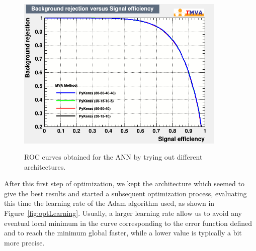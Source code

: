 \documentclass[a4paper, 10pt, openright]{report}
\begin{document}
\begin{appendices}
\begin{figure}[htbp]
\centering
\includegraphics[width=10cm, height=8cm]{figs/DNN_architectures.png}
\caption{\ac{ROC} curves obtained for the \ac{ANN} by trying out different architectures.}
\label{fig:optLayers}
\end{figure}

After this first step of optimization, we kept the architecture which seemed to give the best results and started a subsequent optimization process, evaluating this time the learning rate of the Adam algorithm used, as shown in Figure~\ref{fig:optLearning}. Usually, a larger learning rate allow us to avoid any eventual local minimum in the curve corresponding to the error function defined and to reach the minimum global faster, while a lower value is typically a bit more precise. %



\end{appendices}
\end{document}
